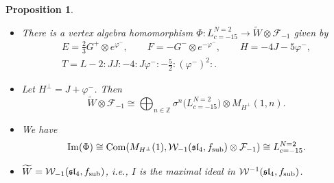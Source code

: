 \documentclass[11pt]{article}
\numberwithin{equation}{section}
\newcommand{\F}{\mathcal F}
\newcommand{\W}{\mathcal W}
\newtheorem{Proposition}[Theorem]{Proposition}
\begin{document}
\begin{Proposition} \label{ulaganje-1}\qquad
\begin{itemize}\itemsep=0pt
\item[$(1)$]There is a vertex algebra homomorphism $\Phi\colon L^{N=2}_{c=-15} \rightarrow \widetilde W \otimes \F_{-1}$ given by
	\begin{gather*}
		E = \frac{2}{3} G^+ \otimes e^{\varphi^-}, \qquad
		F = - G^- \otimes e^{-\varphi^-},\qquad
		H = - 4 J - 5 \varphi^-, \\
		T = L- 2{:}J J {:}-4{:}J\varphi^-{:} -\frac{5}{2}{:}(\varphi^-)^2{:}.
	\end{gather*}
	\item[$(2)$]
	Let $H^{\perp} = J + \varphi^-$. Then
\[
 \widetilde W \otimes \F_{-1} \cong \bigoplus_{n \in {\mathbb{Z}}} \sigma^n \bigl(L^{N=2}_{c=-15}\bigr) \otimes M_{H^\perp} (1, n).
 \]
	\item[$(3)$] We have
\[
\operatorname{Im} (\Phi) \cong \operatorname{Com} (M_{H^{\perp}} (1), \mathcal{W}_{-1}(\mathfrak{sl}_4, f_{\rm sub}) \otimes \F_{-1}) \cong L^{N=2}_{c=-15} .
\]
\item[$(4)$] $\widetilde W = \W_{-1} (\mathfrak{sl}_4, f_{\rm sub})$, i.e., $I$ is the maximal ideal in $\W^{-1}(\mathfrak{sl}_4, f_{\rm sub})$.
\end{itemize}
	
\end{Proposition}
\end{document}
